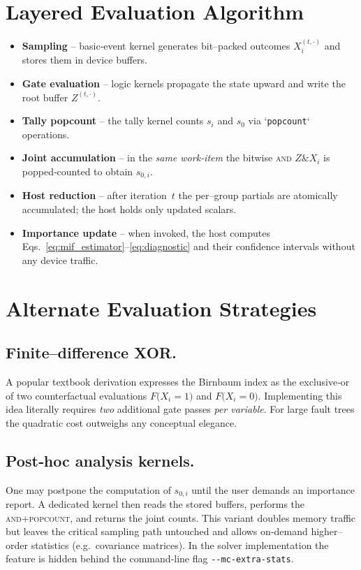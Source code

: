 \section{Layered Evaluation Algorithm}
\begin{itemize}
  \item \textbf{Sampling} – basic‐event kernel generates bit–packed outcomes
    $X_i^{(t,\cdot)}$ and stores them in device buffers.
  \item \textbf{Gate evaluation} – logic kernels propagate the state upward and
    write the root buffer $Z^{(t,\cdot)}$.
  \item \textbf{Tally popcount} – the tally kernel counts $s_i$ and $s_0$ via
    `\texttt{popcount}` operations.
  \item \textbf{Joint accumulation} – in the \emph{same work‐item} the bitwise
    \textsc{and} $Z \& X_i$ is popped‐counted to obtain $s_{0,i}$.
  \item \textbf{Host reduction} – after iteration~$t$ the per–group partials
    are atomically accumulated; the host holds only updated scalars.
  \item \textbf{Importance update} – when invoked, the host computes
    Eqs.~\eqref{eq:mif_estimator}–\eqref{eq:diagnostic} and their confidence
    intervals without any device traffic.
\end{itemize}

\section{Alternate Evaluation Strategies}
\subsection{Finite–difference XOR.}  A popular textbook derivation expresses the
Birnbaum index as the exclusive‐or of two counterfactual evaluations
$F\bigl(X_i\!=\!1\bigr)$ and $F\bigl(X_i\!=\!0\bigr)$.  Implementing this idea
literally requires \emph{two} additional gate passes \emph{per variable}.  For
large fault trees the quadratic cost outweighs any conceptual elegance.

\subsection{Post‐hoc analysis kernels.}  One may postpone the computation of
$s_{0,i}$ until the user demands an importance report.  A dedicated kernel then
reads the stored buffers, performs the \textsc{and}+\textsc{popcount}, and
returns the joint counts.  This variant doubles memory traffic but leaves the
critical sampling path untouched and allows on‐demand higher–order statistics
(e.g.~covariance matrices).  In the solver implementation the feature is hidden
behind the command‐line flag \verb|--mc-extra-stats|.

